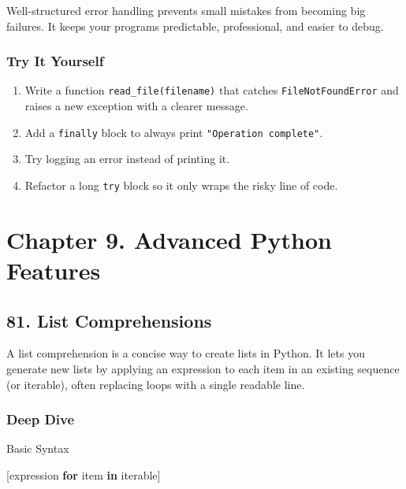 \documentclass[
  letterpaper,
  DIV=11,
  numbers=noendperiod]{scrreprt}
\newenvironment{Shaded}{\begin{snugshade}}{\end{snugshade}}
\newcommand{\ControlFlowTok}[1]{\textcolor[rgb]{0.00,0.23,0.31}{\textbf{#1}}}
\newcommand{\KeywordTok}[1]{\textcolor[rgb]{0.00,0.23,0.31}{\textbf{#1}}}
\newcommand{\NormalTok}[1]{\textcolor[rgb]{0.00,0.23,0.31}{#1}}
\providecommand{\tightlist}{%
  \setlength{\itemsep}{0pt}\setlength{\parskip}{0pt}}
\begin{document}
Well-structured error handling prevents small mistakes from becoming big
failures. It keeps your programs predictable, professional, and easier
to debug.

\subsubsection{Try It Yourself}\label{try-it-yourself-79}

\begin{enumerate}
\def\labelenumi{\arabic{enumi}.}
\tightlist
\item
  Write a function \texttt{read\_file(filename)} that catches
  \texttt{FileNotFoundError} and raises a new exception with a clearer
  message.
\item
  Add a \texttt{finally} block to always print
  \texttt{"Operation\ complete"}.
\item
  Try logging an error instead of printing it.
\item
  Refactor a long \texttt{try} block so it only wraps the risky line of
  code.
\end{enumerate}

\section{Chapter 9. Advanced Python
Features}\label{chapter-9.-advanced-python-features}

\subsection{81. List Comprehensions}\label{list-comprehensions}

A list comprehension is a concise way to create lists in Python. It lets
you generate new lists by applying an expression to each item in an
existing sequence (or iterable), often replacing loops with a single
readable line.

\subsubsection{Deep Dive}\label{deep-dive-80}

Basic Syntax

\begin{Shaded}
\begin{Highlighting}[]
\NormalTok{[expression }\ControlFlowTok{for}\NormalTok{ item }\KeywordTok{in}\NormalTok{ iterable]}
\end{Highlighting}
\end{Shaded}
\end{document}
